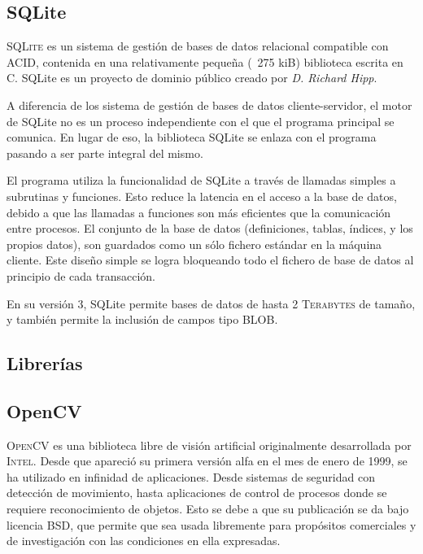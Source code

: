 \documentclass[12pt]{book} %
\begin{document}
	\subsection{SQLite}
		\textsc{SQLite} es un sistema de gestión de bases de datos relacional compatible con \textsc{ACID}, contenida en una
		relativamente pequeña (~275 kiB) biblioteca escrita en C. SQLite es un proyecto de dominio público creado por 
		\textit{D. Richard Hipp}.
		
		A diferencia de los sistema de gestión de bases de datos cliente-servidor, el motor de SQLite no es un proceso independiente 
		con el que el programa principal se comunica. En lugar de eso, la biblioteca SQLite se enlaza con el programa pasando a ser
		parte integral del mismo. 
		
		El programa utiliza la funcionalidad de SQLite a través de llamadas simples a subrutinas y funciones. Esto reduce la latencia 
		en el acceso a la base de datos, debido a que las llamadas a funciones son más eficientes que la comunicación entre procesos. 
		El conjunto de la base de datos (definiciones, tablas, índices, y los propios datos), son guardados como un sólo fichero
		estándar en la máquina cliente. 
		Este diseño simple se logra bloqueando todo el fichero de base de datos al principio de cada transacción.
		
		En su versión 3, SQLite permite bases de datos de hasta \textsc{2 Terabytes} de tamaño, y también permite la inclusión de campos
		tipo \textsc{BLOB}.
		
	\subsection*{Librerías}	
	
	\subsection{OpenCV \label{cv}}
			
		
		\textsc{OpenCV} es una biblioteca libre de visión artificial originalmente desarrollada por \textsc{Intel}. 
		Desde que apareció su primera versión alfa en el mes de enero de 1999, se ha utilizado en infinidad de aplicaciones. 
		Desde sistemas de seguridad con detección de movimiento, hasta aplicaciones de control de procesos donde se requiere
		reconocimiento de objetos. Esto se debe a que su publicación se da bajo licencia \textsc{BSD}, que permite que sea usada
		libremente para propósitos comerciales y de investigación con las condiciones en ella expresadas.
		
\end{document}
